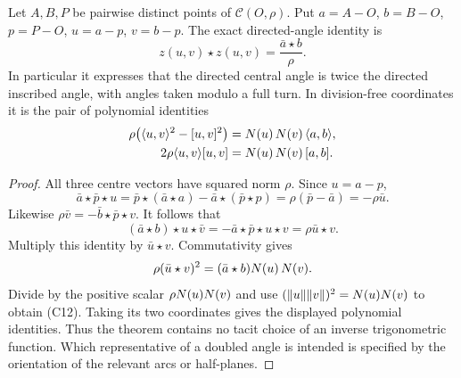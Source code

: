 \begin{theorem}
\label{circ:inscribed}
Let $A,B,P$ be pairwise distinct points of $\mathcal C(O,\rho)$.
Put $a=A-O$, $b=B-O$, $p=P-O$, $u=a-p$, $v=b-p$.
The exact directed-angle identity is
\[
 z(u,v)\star z(u,v)=\frac{\bar a\star b}{\rho}.       \tag{C12}
\]
In particular it expresses that the directed central angle is twice the
directed inscribed angle, with angles taken modulo a full turn.
In division-free coordinates it is the pair of polynomial identities
\begin{align*}
 \rho\bigl(\langle u,v\rangle^2-[u,v]^2\bigr)
       &=N(u)\,N(v)\,\langle a,b\rangle,\\
 2\rho\langle u,v\rangle[u,v]
       &=N(u)\,N(v)\,[a,b].
\end{align*}
\end{theorem}
\begin{proof}
All three centre vectors have squared norm $\rho$.
Since $u=a-p$,
\[
 \bar a\star\bar p\star u
   =\bar p\star(\bar a\star a)
        -\bar a\star(\bar p\star p)
   =\rho(\bar p-\bar a)=-\rho\bar u.
\]
Likewise $\rho\bar v=-\bar b\star\bar p\star v$.
It follows that
\[
 (\bar a\star b)\star u\star\bar v
  =-\bar a\star\bar p\star u\star v
  =\rho\bar u\star v.
\]
Multiply this identity by $\bar u\star v$.  Commutativity gives
\[
 \rho(\bar u\star v)^2
    =(\bar a\star b)N(u)\,N(v).
\]
Divide by the positive scalar
$\rho N(u)N(v)$ and use
$(\lVert u\rVert\lVert v\rVert)^2=N(u)N(v)$ to obtain (C12).
Taking its two coordinates gives the displayed polynomial identities.
Thus the theorem contains no tacit choice of an inverse trigonometric
function.  Which representative of a doubled angle is intended is
specified by the orientation of the relevant arcs or half-planes.
\end{proof}

